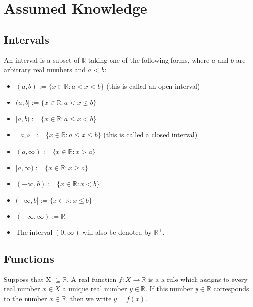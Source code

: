 \documentclass[12pt]{article}
\begin{document}

\tableofcontents
\pagebreak

\section{Assumed Knowledge}
	\subsection{Intervals}
		\begin{defn}
			An interval is a subset of $\mathbb{R}$ taking one of the following forms, where ${a}$ and ${b}$ 					are arbitrary real numbers and ${a}$ < ${b}$:

			\begin{itemize}
				\item $(a,b) := \{x \in \mathbb{R}: a < x < b\}$		(this is called an open interval)
				\item $(a,b] := \{x \in \mathbb{R}: a < x \leq b\}$	
				\item $[a,b) := \{x \in \mathbb{R}: a \leq x < b\}$		
				\item $[a,b] := \{x \in \mathbb{R}: a \leq x \leq b\}$		(this is called a closed interval)
				\item $(a,\infty) := \{x \in \mathbb{R}: x > a\}$		
				\item $[a,\infty) := \{x \in \mathbb{R}: x \geq a\}$		
				\item $(-\infty,b) := \{x \in \mathbb{R}: x < b\}$		
				\item $(-\infty,b] := \{x \in \mathbb{R}: x \leq b\}$
				\item $(-\infty, \infty) := \mathbb{R}$
				\item The interval $(0, \infty)$ will also be denoted by $\mathbb{R}^+$.
			\end{itemize}
		\end{defn}

	\subsection{Functions}
		\begin{defn}
			Suppose that X $\subseteq \mathbb{R}$. A real function $f : X \to \mathbb{R}$ is a a rule which assigns to 				every real number $x \in X$ a unique real number $y \in \mathbb{R}$. If this number $y \in 						\mathbb{R}$ corresponds to the number $x \in \mathbb{R}$, then we write $y = f(x)$.
		\end{defn}
\end{document}
